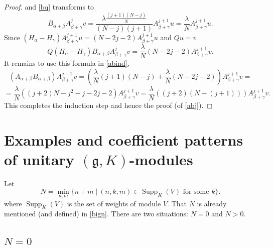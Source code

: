 \documentclass[twoside,a4paper,12pt]{article}
\newcommand{\g}{\ensuremath{\mathfrak g}}
\theoremstyle{definition}
\begin{document}
\begin{proof}
	and \eqref{bq} transforms to
	\begin{equation*}
		B_{\alpha+\beta}A_{\beta+\gamma}^jv=
		\frac{\lambda\frac{(j+1)(N-j)}N}{(N-j)(j+1)}A_{\beta+\gamma}^{j+1}u=
		\frac\lambda NA_{\beta+\gamma}^{j+1}u.
	\end{equation*}
	Since
	$(H_\alpha-H_\gamma)A_{\beta+\gamma}^{j+1}u=(N-2j-2)A_{\beta+\gamma}^{j+1}u$
	and $Qu=v$
	\begin{equation*}
		Q(H_\alpha-H_\gamma)B_{\alpha+\beta}A_{\beta+\gamma}^jv=
		\frac\lambda N(N-2j-2)A_{\beta+\gamma}^{j+1}v.
	\end{equation*}
	It remains to use this formula in \eqref{abind},
	\begin{equation*}
		(A_{\alpha+\beta}B_{\alpha+\beta})A_{\beta+\gamma}^{j+1}v=
		\left(\frac\lambda N(j+1)(N-j)+\frac\lambda N(N-2j-2)
		\right)A_{\beta+\gamma}^{j+1}v=
	\end{equation*}
	\begin{equation*}
		=\frac\lambda N\left((j+2)N-j^2-j-2j-2\right)A_{\beta+\gamma}^{j+1}v=
		\frac\lambda N\left((j+2)(N-(j+1))\right)A_{\beta+\gamma}^{j+1}v.
	\end{equation*}
	This completes the induction step and hence the proof (of \eqref{abj}).
\end{proof}





\section{\texorpdfstring{Examples and coefficient patterns of unitary 
		$(\g,K)$-modules}
		{Examples and coefficient patterns of unitary (g,K)-modules}}

Let
\begin{equation*}
	N=\min_{n,m} \{n+m\;|\: (n,k,m)\in\operatorname{Supp}_K(V)
		\text{ for some }k \}.
\end{equation*}
where $\operatorname{Supp}_K(V)$ is the set of weights of module $V$.
That $N$ is already mentioned (and defined) in \eqref{bign}.
There are two situations: $N=0$ and $N>0$.



\subsection{$N=0$}
\end{document}
